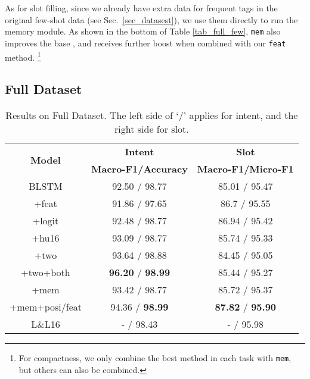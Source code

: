 As for slot filling, since we already have extra data for frequent tags in the original few-shot data (see Sec.~\ref{sec_datasest}), we use them directly to run the memory module. As shown in the bottom of Table \ref{tab_full_few}, \texttt{mem} also improves the base \BLSTM, and receives further boost when combined with our \texttt{feat} method.%
\footnote{For compactness, we only combine the best method in each task with \texttt{mem}, but others can also be combined.}



\subsection{Full Dataset}

\begin{table}
\setlength{\tabcolsep}{0.23em}
\centering
\small{
\begin{tabular}{|c|c|c|}

\hline
\multirow{2}{*}{\textbf{Model}} & \textbf{Intent} & \textbf{Slot} \\
\cline{2-3}
  & \textbf{Macro-F1/Accuracy} &  \textbf{Macro-F1/Micro-F1} \\
\hline
\rowcolor{Gray} BLSTM & 92.50 / 98.77  & 85.01 / 95.47\\
\hline
+feat & 91.86 / 97.65 & 86.7 / 95.55\\
\hline
\rowcolor{Gray} +logit & 92.48 / 98.77 & 86.94 / 95.42  \\
\hline
+hu16 & 93.09 / 98.77 & 85.74 / 95.33  \\
\hline
\rowcolor{Gray} +two & 93.64 / 98.88  & 84.45 / 95.05\\
\hline
+two+both & \textbf{96.20} / \textbf{98.99} & 85.44 / 95.27 \\
\hline
\rowcolor{Gray} +mem & 93.42 / 98.77 & 85.72 / 95.37\\
\hline
+mem+posi/feat & 94.36 / \textbf{98.99} & \textbf{87.82} / \textbf{95.90} \\
\hline
\hline
\rowcolor{Gray} L\&L16 & - / 98.43 & - / 95.98\\
\hline

\end{tabular}
}
\caption{Results on Full Dataset. The left side of `$/$' applies for intent, and the right side for slot.}
\label{tab_full}
\vspace{-1em}
\end{table}


